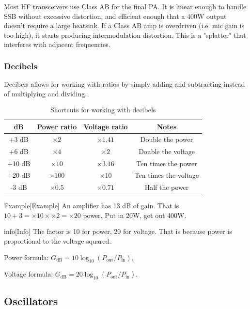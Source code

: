 \documentclass{article}
\begin{document}
Most HF transceivers use Class AB for the final PA. It is linear enough to handle SSB without excessive distortion, and efficient enough that a 400W output doesn't require a large heatsink. If a Class AB amp is overdriven (i.e. mic gain is too high), it starts producing intermodulation distortion. This is a "splatter" that interferes with adjacent frequencies.

\subsubsection{Decibels}
Decibels allows for working with ratios by simply adding and subtracting instead of multiplying and dividing.
\begin{table}[h]
    \centering
    \caption{Shortcuts for working with decibels}
    \label{tab:4}
    \begin{tabular}{c|c|c|c}
        dB & Power ratio & Voltage ratio & Notes \\
        \hline
        \hline
        +3 dB & $\times 2$ & $\times 1.41$ & Double the power \\
        +6 dB & $\times 4$ & $\times 2$ & Double the voltage \\
        +10 dB & $\times 10$ & $\times 3.16$ & Ten times the power \\
        +20 dB & $\times 100$ & $\times 10$ & Ten times the voltage \\
        -3 dB & $\times 0.5$ & $\times 0.71$ & Half the power \\
    \end{tabular}
\end{table}

\begin{callout}{Example}[Example]
    An amplifier has 13 dB of gain. That is $10+3=\times 10\times\times 2=\times 20$ power. Put in 20W, get out 400W.
\end{callout}

\begin{callout}{info}[Info]
    The factor is 10 for power, 20 for voltage. That is because power is proportional to the voltage squared.

    Power formula: $G_{\text{dB}}=10\log_{10}(P_{\text{out}}/P_{\text{in}})$.

    Voltage formula: $G_{\text{dB}}=20\log_{10}(P_{\text{out}}/P_{\text{in}})$.
\end{callout}

\subsection{Oscillators}
\end{document}

